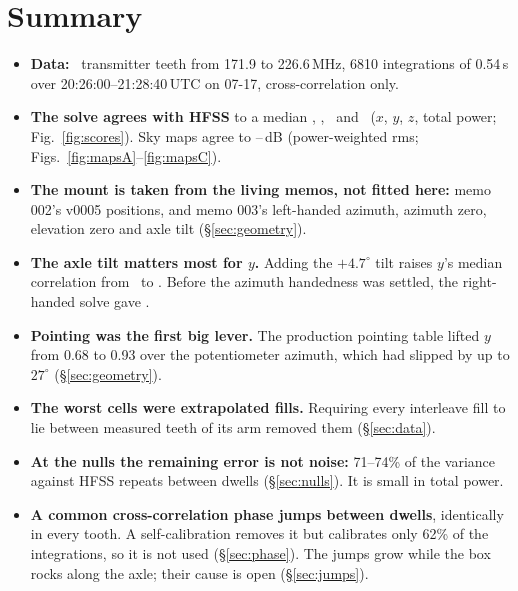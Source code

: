 \documentclass{aastex631}
\begin{document}
\section{Summary}
\begin{itemize}
\item \textbf{Data:} \nTeeth\ transmitter teeth from 171.9 to 226.6\,MHz, 6810 integrations of 0.54\,s over
  20:26:00--21:28:40\,UTC on 07-17, cross-correlation only.
\item \textbf{The solve agrees with HFSS} to a median \medXL, \medYL, \medZL\ and \medPowerL\ ($x$, $y$, $z$,
  total power; Fig.~\ref{fig:scores}). Sky maps agree to \mapRmsDbA--\mapRmsDbC\,dB (power-weighted rms;
  Figs.~\ref{fig:mapsA}--\ref{fig:mapsC}).
\item \textbf{The mount is taken from the living memos, not fitted here:} memo 002's v0005 positions, and memo
  003's left-handed azimuth, azimuth zero, elevation zero and axle tilt (\S\ref{sec:geometry}).
\item \textbf{The axle tilt matters most for $y$.} Adding the $+4.7^\circ$ tilt raises $y$'s median correlation
  from \medYLzero\ to \medYL. Before the azimuth handedness was settled, the right-handed solve gave \medYR.
\item \textbf{Pointing was the first big lever.} The production pointing table lifted $y$ from 0.68 to 0.93 over
  the potentiometer azimuth, which had slipped by up to $27^\circ$ (\S\ref{sec:geometry}).
\item \textbf{The worst cells were extrapolated fills.} Requiring every interleave fill to lie between measured
  teeth of its arm removed them (\S\ref{sec:data}).
\item \textbf{At the nulls the remaining error is not noise:} 71--74\% of the variance against HFSS repeats
  between dwells (\S\ref{sec:nulls}). It is small in total power.
\item \textbf{A common cross-correlation phase jumps between dwells}, identically in every tooth. A
  self-calibration removes it but calibrates only 62\% of the integrations, so it is not used (\S\ref{sec:phase}).
  The jumps grow while the box rocks along the axle; their cause is open (\S\ref{sec:jumps}).
\end{itemize}
\end{document}
